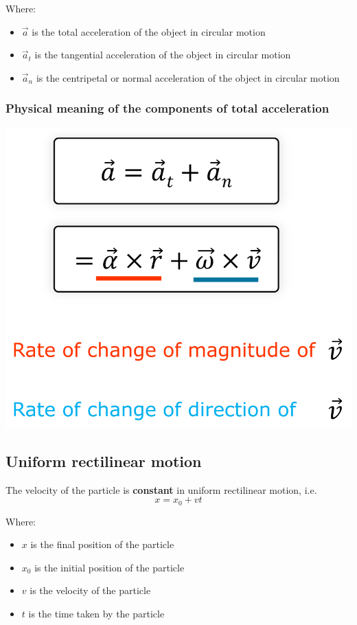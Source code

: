\documentclass[11pt]{article}
\begin{document}
Where:
\begin{itemize}
\item \(\vec{a}\) is the total acceleration of the object in circular motion
\item \(\vec{a}_t\) is the tangential acceleration of the object in circular motion
\item \(\vec{a}_n\) is the centripetal or normal acceleration of the object in circular motion
\end{itemize}
\subsubsection{Physical meaning of the components of total acceleration}
\label{sec:org2da5cd9}
\begin{center}
\includegraphics[width=.9\linewidth]{./images/physical-meaning-of-components-of-total-acceleration.png}
\end{center}

 \newpage
\subsection{Uniform rectilinear motion}
\label{sec:org19064f0}
The velocity of the particle is \textbf{constant} in uniform rectilinear motion, i.e.
\[x = x_0 + vt\]

Where:
\begin{itemize}
\item \(x\) is the final position of the particle
\item \(x_0\) is the initial position of the particle
\item \(v\) is the velocity of the particle
\item \(t\) is the time taken by the particle
\end{itemize}
\end{document}
